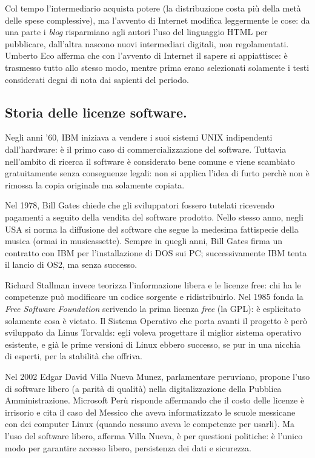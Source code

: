 \documentclass[a4page, 11pt, twocolumn]{article}
\begin{document}
Col tempo l'intermediario acquista potere (la distribuzione costa più della metà delle spese complessive), ma l'avvento di Internet modifica leggermente le cose: da una parte i \textit{blog} risparmiano agli autori l'uso del linguaggio HTML per pubblicare, dall'altra nascono nuovi intermediari digitali, non regolamentati.
Umberto Eco afferma che con l'avvento di Internet il sapere si appiattisce: è trasmesso tutto allo stesso modo, mentre prima erano selezionati solamente i testi considerati degni di nota dai sapienti del periodo.

\subsection{Storia delle licenze software.}
Negli anni '60, IBM iniziava a vendere i suoi sistemi UNIX indipendenti dall'hardware: è il primo caso di commercializzazione del software.
Tuttavia nell'ambito di ricerca il software è considerato bene comune e viene scambiato gratuitamente senza conseguenze legali: non si applica l'idea di furto perchè non è rimossa la copia originale ma solamente copiata.

Nel 1978, Bill Gates chiede che gli sviluppatori fossero tutelati ricevendo pagamenti a seguito della vendita del software prodotto. Nello stesso anno, negli USA si norma la diffusione del software che segue la medesima fattispecie della musica (ormai in musicassette).
Sempre in quegli anni, Bill Gates firma un contratto con IBM per l'installazione di DOS sui PC; successivamente IBM tenta il lancio di OS2, ma senza successo.

Richard Stallman invece teorizza l'informazione libera e le licenze free: chi ha le competenze può modificare un codice sorgente e ridistribuirlo.
Nel 1985 fonda la \textit{Free Software Foundation} scrivendo la prima licenza \textit{free} (la GPL): è esplicitato solamente cosa è vietato.
Il Sistema Operativo che porta avanti il progetto è però sviluppato da Linus Torvalds: egli voleva progettare il miglior sistema operativo esistente, e già le prime versioni di Linux ebbero successo, se pur in una nicchia di esperti, per la stabilità che offriva. \newline

Nel 2002 Edgar David Villa Nueva Munez, parlamentare peruviano, propone l'uso di software libero (a parità di qualità) nella digitalizzazione della Pubblica Amministrazione.
Microsoft Perù risponde affermando che il costo delle licenze è irrisorio e cita il caso del Messico che aveva informatizzato le scuole messicane con dei computer Linux (quando nessuno aveva le competenze per usarli).
Ma l'uso del software libero, afferma Villa Nueva, è per questioni politiche: è l'unico modo per garantire accesso libero, persistenza dei dati e sicurezza. \newline
\end{document}
